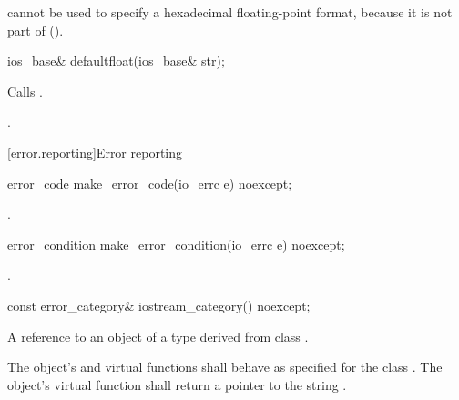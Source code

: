 \pnum
\begin{note}
 cannot be used to specify
a hexadecimal floating-point format,
because it is not part of 
().
\end{note}

%
\begin{itemdecl}
ios_base& defaultfloat(ios_base& str);
\end{itemdecl}

\begin{itemdescr}
\pnum
\effects
Calls .

\pnum
\returns
{}.
\end{itemdescr}

[error.reporting]{Error reporting}

%
\begin{itemdecl}
error_code make_error_code(io_errc e) noexcept;
\end{itemdecl}

\begin{itemdescr}
\pnum
\returns
{}.
\end{itemdescr}

%
\begin{itemdecl}
error_condition make_error_condition(io_errc e) noexcept;
\end{itemdecl}

\begin{itemdescr}
\pnum
\returns
{}.
\end{itemdescr}

%
\begin{itemdecl}
const error_category& iostream_category() noexcept;
\end{itemdecl}

\begin{itemdescr}
\pnum
\returns
A reference to an object of a type derived from class
.

\pnum
The object's  and  virtual functions shall behave as specified for the class . The object's  virtual function shall return a pointer to the string .
\end{itemdescr}



